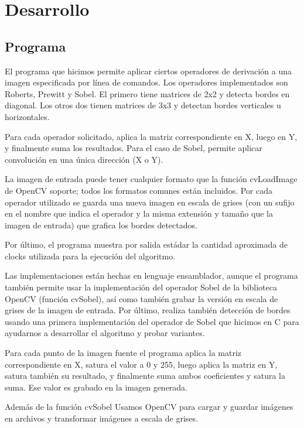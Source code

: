 \section{Desarrollo}

\subsection{Programa}

El programa que hicimos permite aplicar ciertos operadores de derivación a una imagen especificada por línea de comandos. Los operadores implementados son Roberts, Prewitt y Sobel. El primero tiene matrices de 2x2 y detecta bordes en diagonal. Los otros dos tienen matrices de 3x3 y detectan bordes verticales u horizontales.


%
%


Para cada operador solicitado, aplica la matriz correspondiente en X, luego en Y, y finalmente suma los resultados. Para el caso de Sobel, permite aplicar convolución en una única dirección (X o Y).

La imagen de entrada puede tener cualquier formato que la función cvLoadImage de OpenCV soporte; todos los formatos comunes están incluidos. Por cada operador utilizado se guarda una nueva imagen en escala de grises (con un sufijo en el nombre que indica el operador y la misma extensión y tamaño que la imagen de entrada) que grafica los bordes detectados.

Por último, el programa muestra por salida estádar la cantidad aproximada de clocks utilizada para la ejecución del algoritmo.

Las implementaciones están hechas en lenguaje ensamblador, aunque el programa también permite usar la implementación del operador Sobel de la biblioteca OpenCV (función cvSobel), así como también grabar la versión en escala de grises de la imagen de entrada. Por último, realiza también detección de bordes usando una primera implementación del operador de Sobel que hicimos en C para ayudarnos a desarrollar el algoritmo y probar variantes.

Para cada punto de la imagen fuente el programa aplica la matriz correspondiente en X, satura el valor a 0 y 255, luego aplica la matriz en Y, satura también su resultado, y finalmente suma ambos coeficientes y satura la suma. Ese valor es grabado en la imagen generada.

Además de la función cvSobel Usamos OpenCV para cargar y guardar imágenes en archivos y transformar imágenes a escala de grises.


